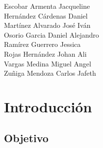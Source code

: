 \documentclass[14pt]{article}
\begin{document}
\begin{center}
        \vspace{3cm}

        \fontsize{14}{baseline skip}Escobar Armenta Jacqueline\\
        \vspace{0.3cm}Hernández Cárdenas Daniel\\
        \vspace{0.3cm}Martínez Alvarado José Iván\\
        \vspace{0.3cm}Osorio Garcia Daniel Alejandro\\
        \vspace{0.3cm}Ramírez Guerrero Jessica\\
        \vspace{0.3cm}Rojas Hernández Johan Ali\\
        \vspace{0.3cm}Vargas Medina Miguel Angel\\
        \vspace{0.3cm}Zuñiga Mendoza Carlos Jafeth

    \end{center}

    \newpage
    \cfoot[]{\thepage}
    \rfoot[]{}
    \large
    


    \newpage
    \tableofcontents
    
    \vspace{0.5cm}
    \maketitle
    \section{Introducción}
        \subsection{Objetivo}
        
\end{document}
